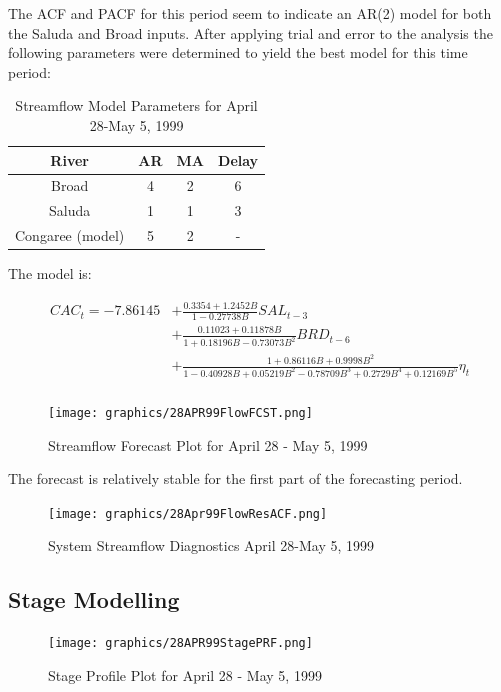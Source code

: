 \documentclass[12pt]{report}
\begin{document}
The ACF and PACF for this period seem to indicate an AR(2) model
for both the Saluda and Broad inputs.  After applying trial and
error to the analysis the following parameters were determined to
yield the best model for this time period:

\begin{table}[h]
\begin{centering}\begin{tabular}{|c|c|c|c|}
\hline \textbf{River} & \textbf{AR} & \textbf{MA} & \textbf{Delay} \\
\hline Broad & 4 & 2 & 6 \\
Saluda & 1 & 1 & 3 \\
Congaree (model) & 5 & 2 & -  \\
\hline
\end{tabular}\caption{Streamflow Model Parameters for April 28-May 5,
1999}
\end{centering}\end{table}

 The model is:

\begin{equation}\begin{split}
\label{eq:28aprflowmodel}
CAC_t=-7.86145&+\frac{0.3354+1.2452B}{1-0.27738B}SAL_{t-3}\\
&+\frac{0.11023+0.11878B}{1+0.18196B-0.73073B^2}BRD_{t-6}\\
&+\frac{1+0.86116B+0.9998B^2}{1-0.40928B+0.05219B^2-0.78709B^3+
0.2729B^4+0.12169B^5}\eta_t\\
\end{split}
\end{equation}

\begin{figure}[h]
\centering\texttt{[image: graphics/28APR99FlowFCST.png]}
\centering\caption{Streamflow Forecast Plot for April 28 - May 5,
1999}
\end{figure}
The forecast is relatively stable for the first part of the
forecasting period.

\begin{figure}[h]
\centering\texttt{[image: graphics/28Apr99FlowResACF.png]}
\centering\caption{System Streamflow Diagnostics April 28-May 5,
1999}
\end{figure}

\subsection{Stage Modelling}

\begin{figure}[h]
\centering\texttt{[image: graphics/28APR99StagePRF.png]}
\centering\caption{Stage Profile Plot for April 28 - May 5, 1999}
\end{figure}
\end{document}
